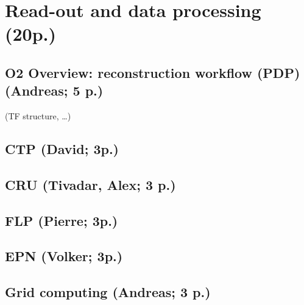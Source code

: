 \section{Read-out and data processing (20p.)}
\subsection{O2 Overview: reconstruction workflow (PDP) (Andreas; 5 p.)}
(TF structure, …)
\subsection{CTP (David; 3p.)}
\subsection{CRU (Tivadar, Alex; 3 p.)}
\subsection{FLP (Pierre; 3p.)}
\subsection{EPN (Volker; 3p.)}
\subsection{Grid computing (Andreas; 3 p.)}
